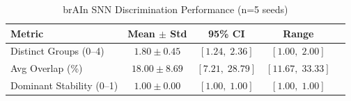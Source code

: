 \begin{table}[h]
\centering
\caption{brAIn SNN Discrimination Performance (n=5 seeds)}
\begin{tabular}{lcccc}
\toprule
        Metric & Mean $\pm$ Std & 95\% CI & Range \\
\midrule
        Distinct Groups (0--4) & $1.80 \pm 0.45$ & $[1.24,\; 2.36]$ & $[1.00,\; 2.00]$ \\
        Avg Overlap (\%) & $18.00 \pm 8.69$ & $[7.21,\; 28.79]$ & $[11.67,\; 33.33]$ \\
        Dominant Stability (0--1) & $1.00 \pm 0.00$ & $[1.00,\; 1.00]$ & $[1.00,\; 1.00]$ \\
\bottomrule
\end{tabular}
\end{table}
